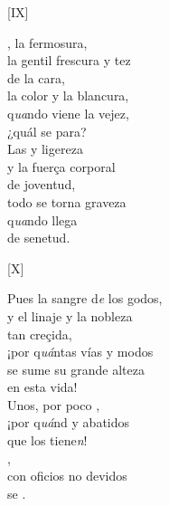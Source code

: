 \documentclass[11pt,a4paper,twoside]{article}
\begin{document}
{\begin{center}
	[IX]
\end{center}
\pstart
{}, la fermosura,\\
la gentil frescura y tez\\
de la cara,\\
la color y la blancura,\\
q\textit{ua}ndo viene la vejez,\\
¿quál se para?\\
Las  y ligereza\\
y la fuerça corporal\\
de joventud,\\
todo se torna graveza\\
q\textit{ua}ndo llega \\
de senetud.
\pend

\begin{center}
	[X]
\end{center}
\pstart
Pues la sangre d\textit{e} los godos,\\
y el linaje y la nobleza\\
tan creçida,\\
¡por q\textit{uá}ntas vías y modos\\
se sume su grande alteza\\
en esta vida!\\
Unos, por poco ,\\
¡por q\textit{uá}nd  y abatidos\\
que los tiene\textit{n}!\\
,\\
con oficios no devidos\\
se .
\pend

}
\end{document}
